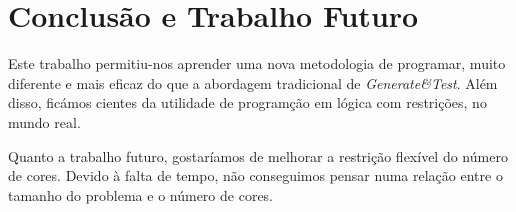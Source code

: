 \section{Conclusão e Trabalho Futuro}
Este trabalho permitiu-nos aprender uma nova metodologia de programar, muito diferente e mais eficaz do que a abordagem tradicional de \textit{Generate\&Test}. Além disso, ficámos cientes da utilidade de programção em lógica com restrições, no mundo real.

Quanto a trabalho futuro, gostaríamos de melhorar a restrição flexível do número de cores. Devido à falta de tempo, não conseguimos pensar numa relação entre o tamanho do problema e o número de cores.